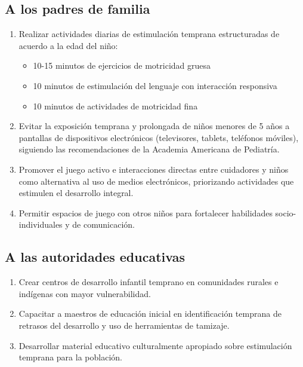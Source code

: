 \subsection*{A los padres de familia}
\begin{enumerate}
\item Realizar actividades diarias de estimulación temprana estructuradas de acuerdo a la edad del niño:
\begin{itemize}
    \item 10-15 minutos de ejercicios de motricidad gruesa
    \item 10 minutos de estimulación del lenguaje con interacción responsiva
    \item 10 minutos de actividades de motricidad fina
\end{itemize}

\item Evitar la exposición temprana y prolongada de niños menores de 
5 años a pantallas de dispositivos electrónicos (televisores, tablets, 
teléfonos móviles), siguiendo las recomendaciones de la Academia Americana 
de Pediatría.

\item Promover el juego activo e interacciones directas entre 
cuidadores y niños como alternativa al uso de medios electrónicos, 
priorizando actividades que estimulen el desarrollo integral.

\item Permitir espacios de juego con otros niños para fortalecer 
habilidades socio-individuales y de comunicación.
\end{enumerate}

\subsection*{A las autoridades educativas}
\begin{enumerate}
\item Crear centros de desarrollo infantil temprano en comunidades rurales 
e indígenas con mayor vulnerabilidad.

\item Capacitar a maestros de educación inicial en identificación temprana 
de retrasos del desarrollo y uso de herramientas de tamizaje.

\item Desarrollar material educativo culturalmente apropiado sobre 
estimulación temprana para la población.
\end{enumerate}

